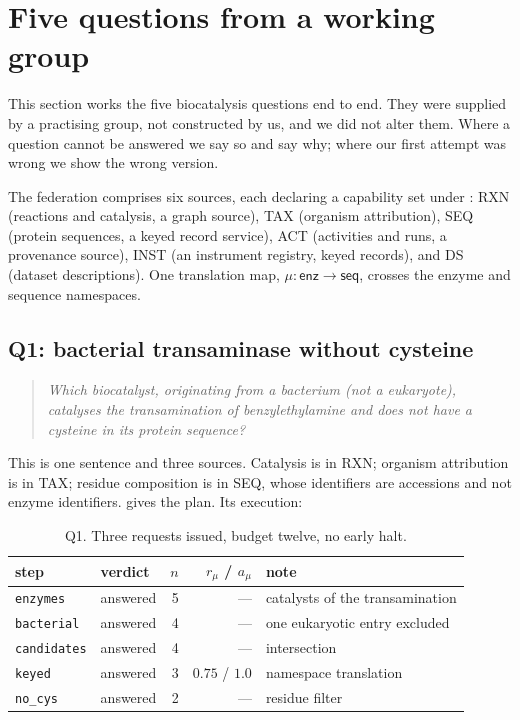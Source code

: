 \documentclass[11pt,a4paper]{article}
\theoremstyle{plain}
\theoremstyle{definition}
\theoremstyle{remark}
\newcommand{\vans}{\textsf{answered}}
\begin{document}
\section{Five questions from a working group}
\label{sec:questions}

This section works the five biocatalysis questions end to end. They were
supplied by a practising group, not constructed by us, and we did not
alter them. Where a question cannot be answered we say so and say why;
where our first attempt was wrong we show the wrong version.

The federation comprises six sources, each declaring a capability set
under : \textsf{RXN} (reactions and catalysis, a graph
source), \textsf{TAX} (organism attribution), \textsf{SEQ} (protein
sequences, a keyed record service), \textsf{ACT} (activities and runs,
a provenance source), \textsf{INST} (an instrument registry, keyed
records), and \textsf{DS} (dataset descriptions). One translation map,
$\mu : \textsf{enz} \to \textsf{seq}$, crosses the enzyme and sequence
namespaces.

\subsection{Q1: bacterial transaminase without cysteine}
\label{sec:q1}

\begin{quote}
\emph{Which biocatalyst, originating from a bacterium (not a
eukaryote), catalyses the transamination of benzylethylamine and does
not have a cysteine in its protein sequence?}
\end{quote}

This is one sentence and three sources. Catalysis is in \textsf{RXN};
organism attribution is in \textsf{TAX}; residue composition is in
\textsf{SEQ}, whose identifiers are accessions and not enzyme
identifiers.  gives the plan. Its execution:

\begin{table}[H]\centering
\begin{tabular}{llrrl}
\toprule
step & verdict & $n$ & $r_\mu$ / $a_\mu$ & note \\
\midrule
\texttt{enzymes}    & \vans & 5 & --- & catalysts of the transamination \\
\texttt{bacterial}  & \vans & 4 & --- & one eukaryotic entry excluded \\
\texttt{candidates} & \vans & 4 & --- & intersection \\
\texttt{keyed}      & \vans & 3 & $0.75$ / $1.0$ & namespace translation \\
\texttt{no\_cys}    & \vans & 2 & --- & residue filter \\
\bottomrule
\end{tabular}
\caption{Q1. Three requests issued, budget twelve, no early halt.}
\label{tab:q1}
\end{table}
\end{document}
